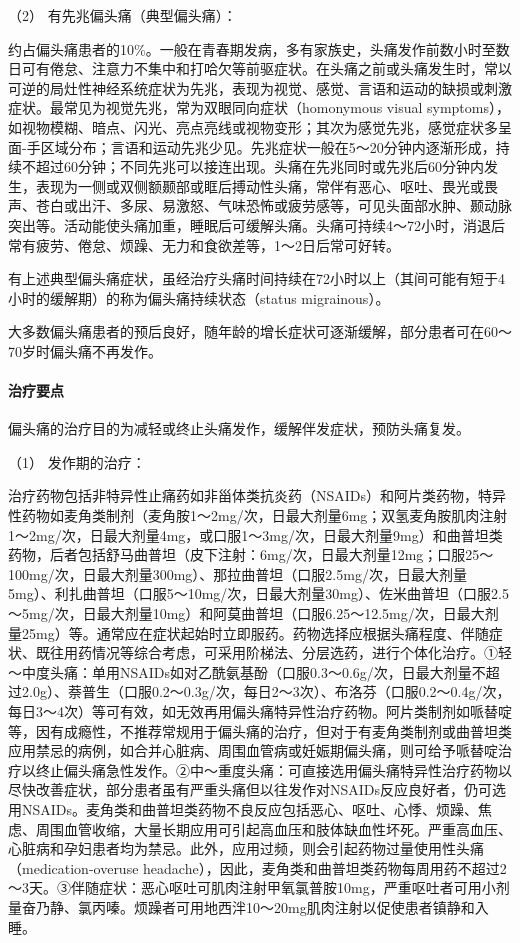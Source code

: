 \hypertarget{text00020.htmlux5cux23CHP1-7-4-1-1-2}{}
（2） 有先兆偏头痛（典型偏头痛）：

约占偏头痛患者的10\%。一般在青春期发病，多有家族史，头痛发作前数小时至数日可有倦怠、注意力不集中和打哈欠等前驱症状。在头痛之前或头痛发生时，常以可逆的局灶性神经系统症状为先兆，表现为视觉、感觉、言语和运动的缺损或刺激症状。最常见为视觉先兆，常为双眼同向症状（homonymous
visual
symptoms），如视物模糊、暗点、闪光、亮点亮线或视物变形；其次为感觉先兆，感觉症状多呈面-手区域分布；言语和运动先兆少见。先兆症状一般在5～20分钟内逐渐形成，持续不超过60分钟；不同先兆可以接连出现。头痛在先兆同时或先兆后60分钟内发生，表现为一侧或双侧额颞部或眶后搏动性头痛，常伴有恶心、呕吐、畏光或畏声、苍白或出汗、多尿、易激怒、气味恐怖或疲劳感等，可见头面部水肿、颞动脉突出等。活动能使头痛加重，睡眠后可缓解头痛。头痛可持续4～72小时，消退后常有疲劳、倦怠、烦躁、无力和食欲差等，1～2日后常可好转。

有上述典型偏头痛症状，虽经治疗头痛时间持续在72小时以上（其间可能有短于4小时的缓解期）的称为偏头痛持续状态（status
migrainous）。

大多数偏头痛患者的预后良好，随年龄的增长症状可逐渐缓解，部分患者可在60～70岁时偏头痛不再发作。

\paragraph{治疗要点}

偏头痛的治疗目的为减轻或终止头痛发作，缓解伴发症状，预防头痛复发。

\hypertarget{text00020.htmlux5cux23CHP1-7-4-1-2-1}{}
（1） 发作期的治疗：

治疗药物包括非特异性止痛药如非甾体类抗炎药（NSAIDs）和阿片类药物，特异性药物如麦角类制剂（麦角胺1～2mg/次，日最大剂量6mg；双氢麦角胺肌肉注射1～2mg/次，日最大剂量4mg，或口服1～3mg/次，日最大剂量9mg）和曲普坦类药物，后者包括舒马曲普坦（皮下注射：6mg/次，日最大剂量12mg；口服25～100mg/次，日最大剂量300mg）、那拉曲普坦（口服2.5mg/次，日最大剂量5mg）、利扎曲普坦（口服5～10mg/次，日最大剂量30mg）、佐米曲普坦（口服2.5～5mg/次，日最大剂量10mg）和阿莫曲普坦（口服6.25～12.5mg/次，日最大剂量25mg）等。通常应在症状起始时立即服药。药物选择应根据头痛程度、伴随症状、既往用药情况等综合考虑，可采用阶梯法、分层选药，进行个体化治疗。①轻～中度头痛：单用NSAIDs如对乙酰氨基酚（口服0.3～0.6g/次，日最大剂量不超过2.0g）、萘普生（口服0.2～0.3g/次，每日2～3次）、布洛芬（口服0.2～0.4g/次，每日3～4次）等可有效，如无效再用偏头痛特异性治疗药物。阿片类制剂如哌替啶等，因有成瘾性，不推荐常规用于偏头痛的治疗，但对于有麦角类制剂或曲普坦类应用禁忌的病例，如合并心脏病、周围血管病或妊娠期偏头痛，则可给予哌替啶治疗以终止偏头痛急性发作。②中～重度头痛：可直接选用偏头痛特异性治疗药物以尽快改善症状，部分患者虽有严重头痛但以往发作对NSAIDs反应良好者，仍可选用NSAIDs。麦角类和曲普坦类药物不良反应包括恶心、呕吐、心悸、烦躁、焦虑、周围血管收缩，大量长期应用可引起高血压和肢体缺血性坏死。严重高血压、心脏病和孕妇患者均为禁忌。此外，应用过频，则会引起药物过量使用性头痛（medication-overuse
headache），因此，麦角类和曲普坦类药物每周用药不超过2～3天。③伴随症状：恶心呕吐可肌肉注射甲氧氯普胺10mg，严重呕吐者可用小剂量奋乃静、氯丙嗪。烦躁者可用地西泮10～20mg肌肉注射以促使患者镇静和入睡。

